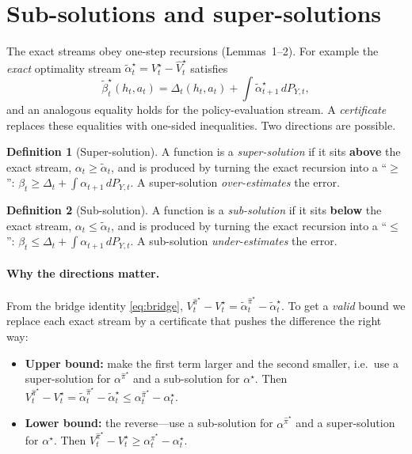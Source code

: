 \documentclass[11pt]{article}
\newcommand{\Vhat}{\hat V}
\newcommand{\pihat}{\hat\pi}
\newcommand{\PY}{P_{Y,t}}
\theoremstyle{definition}
\newtheorem{definition}{Definition}
\begin{document}
\section{Sub-solutions and super-solutions}
The exact streams obey one-step recursions (Lemmas~1--2). For example the
\emph{exact} optimality stream $\tilde\alpha^\star_t=V^\star_t-\Vhat^\star_t$
satisfies
\begin{equation}
\tilde\beta^\star_t(h_t,a_t)=\Delta_t(h_t,a_t)+\int \tilde\alpha^\star_{t+1}\,d\PY ,
\label{eq:exactrec}
\end{equation}
and an analogous equality holds for the policy-evaluation stream. A
\emph{certificate} replaces these equalities with one-sided inequalities. Two
directions are possible.

\begin{definition}[Super-solution]
A function is a \emph{super-solution} if it sits \textbf{above} the exact stream,
$\alpha_t\ge\tilde\alpha_t$, and is produced by turning the exact recursion into a
``$\ge$'': $\beta_t\ge\Delta_t+\int\alpha_{t+1}\,d\PY$. A super-solution
\emph{over-estimates} the error.
\end{definition}

\begin{definition}[Sub-solution]
A function is a \emph{sub-solution} if it sits \textbf{below} the exact stream,
$\alpha_t\le\tilde\alpha_t$, and is produced by turning the exact recursion into a
``$\le$'': $\beta_t\le\Delta_t+\int\alpha_{t+1}\,d\PY$. A sub-solution
\emph{under-estimates} the error.
\end{definition}

\paragraph{Why the directions matter.} From the bridge identity
\eqref{eq:bridge}, $V^{\pihat^\star}_t-V^\star_t=\tilde\alpha^{\pihat^\star}_t-\tilde\alpha^\star_t$.
To get a \emph{valid} bound we replace each exact stream by a certificate that
pushes the difference the right way:
\begin{itemize}
\item \textbf{Upper bound:} make the first term larger and the second smaller, i.e.\
use a super-solution for $\alpha^{\pihat^\star}$ and a sub-solution for
$\alpha^\star$. Then
$V^{\pihat^\star}_t-V^\star_t=\tilde\alpha^{\pihat^\star}_t-\tilde\alpha^\star_t
\le \alpha^{\pihat^\star}_t-\alpha^\star_t$.
\item \textbf{Lower bound:} the reverse---use a sub-solution for
$\alpha^{\pihat^\star}$ and a super-solution for $\alpha^\star$. Then
$V^{\pihat^\star}_t-V^\star_t\ge \alpha^{\pihat^\star}_t-\alpha^\star_t$.
\end{itemize}
\end{document}
